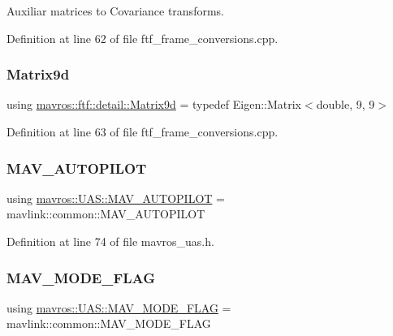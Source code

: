 Auxiliar matrices to Covariance transforms. 



Definition at line 62 of file ftf\+\_\+frame\+\_\+conversions.\+cpp.

\mbox{\label{group__nodelib_ga8aed658f3bc8ce4b4d5776a82c8ef67e}} 
\subsubsection{\texorpdfstring{Matrix9d}{Matrix9d}}
{\footnotesize\ttfamily using \mbox{\hyperlink{group__nodelib_ga8aed658f3bc8ce4b4d5776a82c8ef67e}{mavros\+::ftf\+::detail\+::\+Matrix9d}} = typedef Eigen\+::\+Matrix$<$double, 9, 9$>$}



Definition at line 63 of file ftf\+\_\+frame\+\_\+conversions.\+cpp.

\mbox{\label{group__nodelib_gab6b5a708dff72c3923fd71d8d4730e3e}} 
\subsubsection{\texorpdfstring{MAV\_AUTOPILOT}{MAV\_AUTOPILOT}}
{\footnotesize\ttfamily using \mbox{\hyperlink{group__nodelib_gab6b5a708dff72c3923fd71d8d4730e3e}{mavros\+::\+U\+A\+S\+::\+M\+A\+V\+\_\+\+A\+U\+T\+O\+P\+I\+L\+OT}} =  mavlink\+::common\+::\+M\+A\+V\+\_\+\+A\+U\+T\+O\+P\+I\+L\+OT}



Definition at line 74 of file mavros\+\_\+uas.\+h.

\mbox{\label{group__nodelib_gaa4ceb4f80ab2af120df172fcb47a7d65}} 
\subsubsection{\texorpdfstring{MAV\_MODE\_FLAG}{MAV\_MODE\_FLAG}}
{\footnotesize\ttfamily using \mbox{\hyperlink{group__nodelib_gaa4ceb4f80ab2af120df172fcb47a7d65}{mavros\+::\+U\+A\+S\+::\+M\+A\+V\+\_\+\+M\+O\+D\+E\+\_\+\+F\+L\+AG}} =  mavlink\+::common\+::\+M\+A\+V\+\_\+\+M\+O\+D\+E\+\_\+\+F\+L\+AG}



